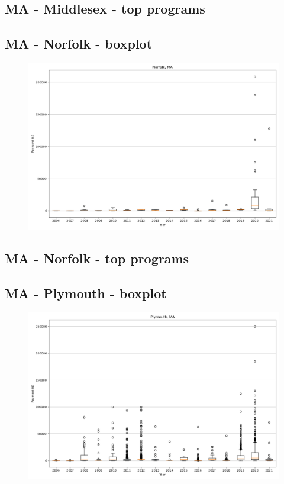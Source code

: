 \subsection*{MA - Middlesex - top programs}

\newpage
\subsection*{MA - Norfolk - boxplot}
\begin{figure}[h]
\centering
\includegraphics[width=7in]{../output/boxplots/counties/Norfolk-MA_boxplot.png}
\end{figure}


\subsection*{MA - Norfolk - top programs}

\newpage
\subsection*{MA - Plymouth - boxplot}
\begin{figure}[h]
\centering
\includegraphics[width=7in]{../output/boxplots/counties/Plymouth-MA_boxplot.png}
\end{figure}


